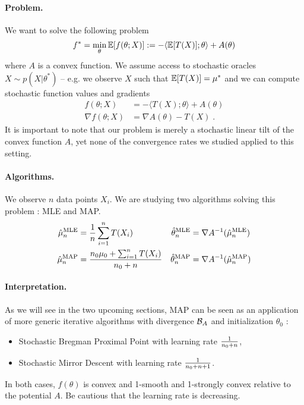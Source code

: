 \documentclass{article}
\newcommand{\logpart}{A}
\newcommand{\bregman}{\cB_\logpart}
\newcommand{\natp}{\theta}
\newcommand{\MAPm}{\hat \mu_n}
\newcommand{\MAPt}{\hat \natp_n}
\begin{document}
\paragraph{Problem.}
We want  to solve the following problem
\begin{align}
	f^* = \min_\natp \E[f(\natp ; X)] := -\langle \E[T(X)] ; \natp \rangle + \logpart(\natp)
\end{align}
where $\logpart$ is a convex function.
We assume access to stochastic oracles $X \sim p(X | \natp^*)$ -- e.g. we observe $X$ such that $\operatorname{\mathbb{E}}[T(X)] = \mu^*$ and we can compute  stochastic function values and gradients 
\begin{align}
	f(\natp ; X) &= -\langle T(X) ; \natp \rangle + \logpart(\natp) \\
	\nabla f(\natp ; X) &= \nabla \logpart(\natp) - T(X)\; .
\end{align}
It is important to note that our problem is merely a stochastic linear tilt of the convex function $\logpart$, yet none of the convergence rates we studied applied to this setting.

\paragraph{Algorithms.}
We observe $n$ data points $X_i$. 
We are studying two algorithms solving this problem : MLE and MAP.
\begin{align}
	\MAPm^\text{MLE} &= \inv{n}\sum_{i=1}^n T(X_i) 
	&\MAPt^\text{MLE} &= \nabla\logpart^{-1}(\MAPm^\text{MLE}) \\
	\MAPm^\text{MAP} &= \frac{n_0\mu_0 + \smallsum_{i=1}^n T(X_i)}{n_0 + n}
	&\MAPt^\text{MAP} &= \nabla\logpart^{-1}(\MAPm^\text{MAP})	
\end{align}

\paragraph{Interpretation.}
As we will see in the two upcoming sections, MAP can be seen as an application of more generic iterative algorithms with divergence $\bregman$ and initialization $\natp_0$ : 
\begin{itemize}
	\item Stochastic Bregman Proximal Point with learning rate $\frac{1}{n_0+n}$,
	\item Stochastic Mirror Descent with learning rate  $\frac{1}{n_0+n +1}$.
\end{itemize}
In both cases, $f(\natp)$ is convex and 1-smooth  and 1-strongly convex relative to the potential $\logpart$. Be cautious that the learning rate is decreasing.
\end{document}
